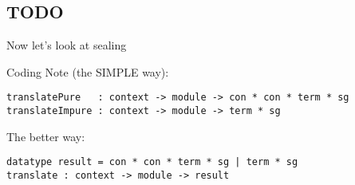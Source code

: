 \begin{mathpar}
\end{mathpar}

\begin{mathpar}
\end{mathpar}


\subsection{TODO}
Now let's look at sealing
\begin{mathpar}

\end{mathpar}

Coding Note (the SIMPLE way):
\begin{lstlisting}
translatePure   : context -> module -> con * con * term * sg
translateImpure : context -> module -> term * sg
\end{lstlisting}
The better way:
\begin{lstlisting}
datatype result = con * con * term * sg | term * sg
translate : context -> module -> result
\end{lstlisting}
